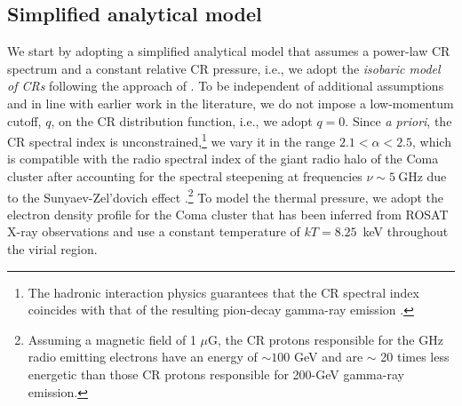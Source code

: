 \documentclass[12pt,manuscript]{aastex}
\newcommand{\rmn}{\mathrm}
\begin{document}
%
%

\subsection{Simplified analytical model}
\label{sec:simple}

We start by adopting a simplified analytical model that assumes a power-law CR spectrum and a
constant relative CR pressure, i.e., we adopt the {\em isobaric model of CRs} following the approach
of \citet{article:PfrommerEnsslin:2004b}. To be independent of additional assumptions and in line
with earlier work in the literature, we do not impose a low-momentum cutoff, $q$, on the CR
distribution function, i.e., we adopt $q=0$. Since {\em a priori}, the CR spectral index is
unconstrained,\footnote{The hadronic interaction physics guarantees that the CR spectral index
coincides with that of the resulting pion-decay gamma-ray emission
\citep[see discussion in][]{article:PfrommerEnsslin:2004b}.} we vary it in the range
$2.1<\alpha<2.5$, which is compatible with the radio spectral index of the giant radio halo of the
Coma cluster after accounting for the spectral steepening at frequencies $\nu\sim5~\rmn{GHz}$ due to
the Sunyaev-Zel'dovich effect \citep{article:Ensslin:2002,
article:PfrommerEnsslin:2004b}.\footnote{Assuming a magnetic field of 1 $\mu$G, the CR protons
responsible for the GHz radio emitting electrons have an energy of $\sim100$ GeV and are $\sim$ 20
times less energetic than those CR protons responsible for 200-GeV gamma-ray emission.} To model
the thermal pressure, we adopt the electron density profile for the Coma cluster that has been
inferred from ROSAT X-ray observations \citep{article:BrielHenryBohringer:1992} and use a constant
temperature of $kT= 8.25$~keV throughout the virial region.
\end{document}
